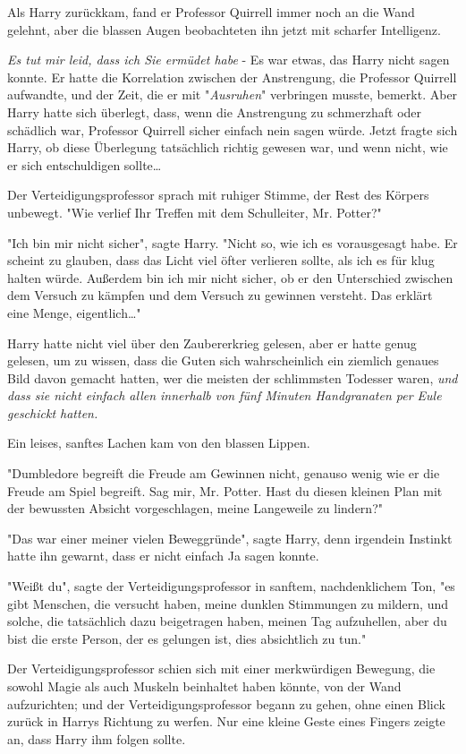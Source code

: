 {Als Harry zurückkam, fand er Professor Quirrell immer noch an die Wand gelehnt, aber die blassen Augen beobachteten ihn jetzt mit scharfer Intelligenz.

\emph{Es tut mir leid, dass ich Sie ermüdet habe} - Es war etwas, das Harry nicht sagen konnte. Er hatte die Korrelation zwischen der Anstrengung, die Professor Quirrell aufwandte, und der Zeit, die er mit "\emph{Ausruhen}" verbringen musste, bemerkt. Aber Harry hatte sich überlegt, dass, wenn die Anstrengung zu schmerzhaft oder schädlich war, Professor Quirrell sicher einfach nein sagen würde. Jetzt fragte sich Harry, ob diese Überlegung tatsächlich richtig gewesen war, und wenn nicht, wie er sich entschuldigen sollte…

Der Verteidigungsprofessor sprach mit ruhiger Stimme, der Rest des Körpers unbewegt. "Wie verlief Ihr Treffen mit dem Schulleiter, Mr. Potter?"

"Ich bin mir nicht sicher", sagte Harry. "Nicht so, wie ich es vorausgesagt habe. Er scheint zu glauben, dass das Licht viel öfter verlieren sollte, als ich es für klug halten würde. Außerdem bin ich mir nicht sicher, ob er den Unterschied zwischen dem Versuch zu kämpfen und dem Versuch zu gewinnen versteht. Das erklärt eine Menge, eigentlich…"

Harry hatte nicht viel über den Zaubererkrieg gelesen, aber er hatte genug gelesen, um zu wissen, dass die Guten sich wahrscheinlich ein ziemlich genaues Bild davon gemacht hatten, wer die meisten der schlimmsten Todesser waren, \emph{und dass sie nicht einfach allen innerhalb von fünf Minuten Handgranaten per Eule geschickt hatten.}

Ein leises, sanftes Lachen kam von den blassen Lippen.

"Dumbledore begreift die Freude am Gewinnen nicht, genauso wenig wie er die Freude am Spiel begreift. Sag mir, Mr. Potter. Hast du diesen kleinen Plan mit der bewussten Absicht vorgeschlagen, meine Langeweile zu lindern?"

"Das war einer meiner vielen Beweggründe", sagte Harry, denn irgendein Instinkt hatte ihn gewarnt, dass er nicht einfach Ja sagen konnte.

"Weißt du", sagte der Verteidigungsprofessor in sanftem, nachdenklichem Ton, "es gibt Menschen, die versucht haben, meine dunklen Stimmungen zu mildern, und solche, die tatsächlich dazu beigetragen haben, meinen Tag aufzuhellen, aber du bist die erste Person, der es gelungen ist, dies absichtlich zu tun."

Der Verteidigungsprofessor schien sich mit einer merkwürdigen Bewegung, die sowohl Magie als auch Muskeln beinhaltet haben könnte, von der Wand aufzurichten; und der Verteidigungsprofessor begann zu gehen, ohne einen Blick zurück in Harrys Richtung zu werfen. Nur eine kleine Geste eines Fingers zeigte an, dass Harry ihm folgen sollte.

}
